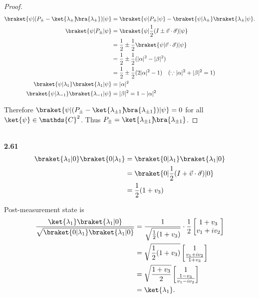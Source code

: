 \documentclass[10pt]{book}
\newcommand{\kb}[1]{\ket{#1}\hspace{-1mm} \bra{#1}} %
\newcommand{\Textbf}[1]{\hspace{3mm}\\ \textbf{#1}\\}
\begin{document}
\begin{proof}
		\begin{equation}
\begin{aligned}
			\braket{\psi | (P_{\pm} - \kb{\lambda_\pm})| \psi}
			&= \braket{\psi | P_\pm | \psi} - \braket{\psi | \lambda_\pm} \braket{\lambda_\pm | \psi}.\\
			\braket{\psi | P_\pm | \psi} &= \braket{\psi | \frac{1}{2}(I \pm \vec{v} \cdot \vec{\sigma}) | \psi}\\
			&= \frac{1}{2} \pm \frac{1}{2} \braket{\psi | \vec{v} \cdot \vec{\sigma})| \psi}\\
			&= \frac{1}{2} \pm \frac{1}{2} (|\alpha|^2 - |\beta|^2)\\
			&= \frac{1}{2} \pm \frac{1}{2} (2|\alpha|^2 - 1) ~~~(\because |\alpha|^2 + |\beta|^2 = 1)\\
			\braket{\psi | \lambda_1} \braket{\lambda_1 | \psi} &= |\alpha|^2\\
			\braket{\psi | \lambda_{-1}} \braket{\lambda_{-1}| \psi} &= |\beta|^2 = 1  - |\alpha|^2
		\end{aligned}
\end{equation}
		
		Therefore $\braket{\psi | (P_\pm - \kb{\lambda_{\pm 1}})| \psi} = 0$ for all $\ket{\psi} \in \mathds{C}^2$.
		Thus $P_\pm = \kb{\lambda_{\pm 1}}$.
	\end{proof}
	
	\Textbf{2.61}
	\begin{equation}
\begin{aligned}
		\braket{\lambda_1 | 0} \braket{0 | \lambda_1} &= \braket{0 | \lambda_1} \braket{\lambda_1 | 0}\\
		&= \braket{0 | \frac{1}{2} ( I + \vec{v} \cdot \vec{\sigma} ) | 0}\\
		&= \frac{1}{2} (1 + v_3)
	\end{aligned}
\end{equation}
	
	Post-measurement state is
	\begin{equation}
\begin{aligned}
		\frac{\ket{\lambda_1} \braket{\lambda_1 | 0}}{ \sqrt{\braket{0 | \lambda_1} \braket{\lambda_1 | 0}} } &= \frac{1}{\sqrt{\frac{1}{2} (1 + v_3)}}
		\cdot \frac{1}{2}
		\begin{bmatrix}
			1 + v_3 \\
			v_1 + iv_2
		\end{bmatrix} \\
		&= \sqrt{ \frac{1}{2}  (1 + v_3) } \begin{bmatrix}
			1 \\
			\frac{v_1 + iv_2}{1+v_3}
		\end{bmatrix} \\
		&=  \sqrt{ \frac{1 + v_3}{2} } \begin{bmatrix}
			1 \\
			\frac{1 - v_3}{v_1 - iv_2}
		\end{bmatrix} \\
		&= \ket{\lambda_1}.
	\end{aligned}
\end{equation}
	
\end{document}
